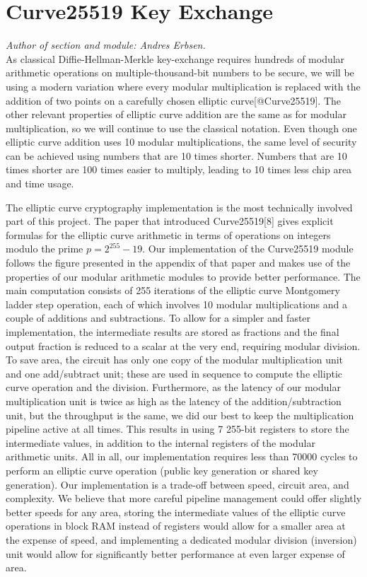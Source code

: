 \section{Curve25519 Key Exchange}\label{curve25519-key-exchange}

\emph{Author of section and module: Andres Erbsen.}\\As classical
Diffie-Hellman-Merkle key-exchange requires hundreds of modular
arithmetic operations on multiple-thousand-bit numbers to be secure, we
will be using a modern variation where every modular multiplication is
replaced with the addition of two points on a carefully chosen elliptic
curve{[}@Curve25519{]}. The other relevant properties of elliptic curve
addition are the same as for modular multiplication, so we will continue
to use the classical notation. Even though one elliptic curve addition
uses 10 modular multiplications, the same level of security can be
achieved using numbers that are 10 times shorter. Numbers that are 10
times shorter are 100 times easier to multiply, leading to 10 times less
chip area and time usage.

The elliptic curve cryptography implementation is the most technically
involved part of this project. The paper that introduced
Curve25519{[}8{]} gives explicit formulas for the elliptic curve
arithmetic in terms of operations on integers modulo the prime
\(p=2^{255} -19\). Our implementation of the Curve25519 module follows
the figure presented in the appendix of that paper and makes use of the
properties of our modular arithmetic modules to provide better
performance. The main computation consists of 255 iterations of the
elliptic curve Montgomery ladder step operation, each of which involves
10 modular multiplications and a couple of additions and subtractions.
To allow for a simpler and faster implementation, the intermediate
results are stored as fractions and the final output fraction is reduced
to a scalar at the very end, requiring modular division. To save area,
the circuit has only one copy of the modular multiplication unit and one
add/subtract unit; these are used in sequence to compute the elliptic
curve operation and the division. Furthermore, as the latency of our
modular multiplication unit is twice as high as the latency of the
addition/subtraction unit, but the throughput is the same, we did our
best to keep the multiplication pipeline active at all times. This
results in using 7 255-bit registers to store the intermediate values,
in addition to the internal registers of the modular arithmetic units.
All in all, our implementation requires less than 70000 cycles to
perform an elliptic curve operation (public key generation or shared key
generation). Our implementation is a trade-off between speed, circuit
area, and complexity. We believe that more careful pipeline management
could offer slightly better speeds for any area, storing the
intermediate values of the elliptic curve operations in block RAM
instead of registers would allow for a smaller area at the expense of
speed, and implementing a dedicated modular division (inversion) unit
would allow for significantly better performance at even larger expense
of area.

